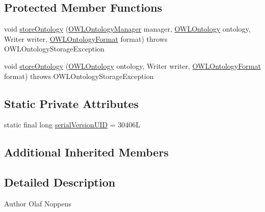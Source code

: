 \subsection*{Protected Member Functions}
\begin{DoxyCompactItemize}
\item 
void \hyperlink{classde_1_1uulm_1_1ecs_1_1ai_1_1owlapi_1_1krssrenderer_1_1_k_r_s_s2_o_w_l_syntax_ontology_storer_af47b410f22b7b0aaf6635210092562ca}{store\-Ontology} (\hyperlink{interfaceorg_1_1semanticweb_1_1owlapi_1_1model_1_1_o_w_l_ontology_manager}{O\-W\-L\-Ontology\-Manager} manager, \hyperlink{interfaceorg_1_1semanticweb_1_1owlapi_1_1model_1_1_o_w_l_ontology}{O\-W\-L\-Ontology} ontology, Writer writer, \hyperlink{classorg_1_1semanticweb_1_1owlapi_1_1model_1_1_o_w_l_ontology_format}{O\-W\-L\-Ontology\-Format} format)  throws O\-W\-L\-Ontology\-Storage\-Exception 
\item 
void \hyperlink{classde_1_1uulm_1_1ecs_1_1ai_1_1owlapi_1_1krssrenderer_1_1_k_r_s_s2_o_w_l_syntax_ontology_storer_a510d2145e774333c88e0ae74fa0a64ee}{store\-Ontology} (\hyperlink{interfaceorg_1_1semanticweb_1_1owlapi_1_1model_1_1_o_w_l_ontology}{O\-W\-L\-Ontology} ontology, Writer writer, \hyperlink{classorg_1_1semanticweb_1_1owlapi_1_1model_1_1_o_w_l_ontology_format}{O\-W\-L\-Ontology\-Format} format)  throws O\-W\-L\-Ontology\-Storage\-Exception 
\end{DoxyCompactItemize}
\subsection*{Static Private Attributes}
\begin{DoxyCompactItemize}
\item 
static final long \hyperlink{classde_1_1uulm_1_1ecs_1_1ai_1_1owlapi_1_1krssrenderer_1_1_k_r_s_s2_o_w_l_syntax_ontology_storer_ae4a23b69251a1eeab87ed8506982c7e8}{serial\-Version\-U\-I\-D} = 30406\-L
\end{DoxyCompactItemize}
\subsection*{Additional Inherited Members}


\subsection{Detailed Description}
\begin{DoxyAuthor}{Author}
Olaf Noppens 
\end{DoxyAuthor}


